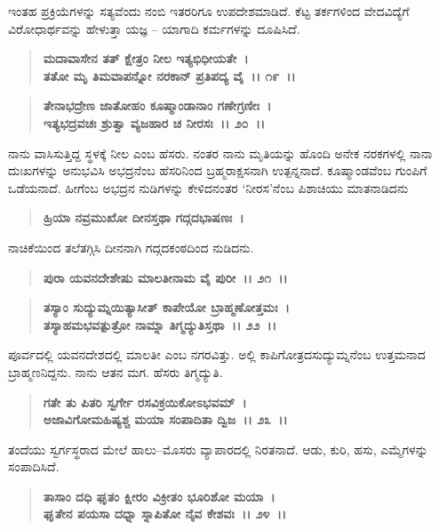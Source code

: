 ಇಂತಹ ಪ್ರಕ್ರಿಯೆಗಳನ್ನು ಸತ್ಯವೆಂದು ನಂಬಿ ಇತರರಿಗೂ ಉಪದೇಶಮಾಡಿದೆ. ಕೆಟ್ಟ ತರ್ಕಗಳಿಂದ ವೇದವಿದ್ಯೆಗೆ ವಿರೋಧಾರ್ಥವನ್ನು ಹೇಳುತ್ತಾ ಯಜ್ಞ – ಯಾಗಾದಿ ಕರ್ಮಗಳನ್ನು ದೂಷಿಸಿದೆ.

\begin{verse}
\textbf{ಮದಾವಾಸೇನ ತತ್ ಕ್ಷೇತ್ರಂ ನೀಲ ಇತ್ಯಭಿಧೀಯತೇ~।}\\\textbf{ತತೋ ಮೃ ತಿಮವಾಪನ್ನೋ ನರಕಾನ್ ಪ್ರತಿಪದ್ಯ ವೈ~।। ೧೯~।। }
\end{verse}

\begin{verse}
\textbf{ತೇನಾಭದ್ರೇಣ ಜಾತೋಹಂ ಕೂಷ್ಮಾಂಡಾನಾಂ ಗಣೇಗ್ರಣೀಃ~।}\\\textbf{ಇತ್ಯಭದ್ರವಚಃ ಶ್ರುತ್ವಾ ವ್ಯಜಹಾರ ಚ ನೀರಸಃ~।। ೨೦~।।}
\end{verse}

ನಾನು ವಾಸಿಸುತ್ತಿದ್ದ ಸ್ಥಳಕ್ಕೆ ನೀಲ ಎಂಬ ಹೆಸರು. ನಂತರ ನಾನು ಮೃತಿಯನ್ನು ಹೊಂದಿ ಅನೇಕ ನರಕಗಳಲ್ಲಿ ನಾನಾ ದುಃಖಗಳನ್ನು ಅನುಭವಿಸಿ ಅಭದ್ರನೆಂಬ ಹೆಸರಿನಿಂದ ಬ್ರಹ್ಮರಾಕ್ಷಸನಾಗಿ ಉತ್ಪನ್ನನಾದೆ. ಕೂಷ್ಮಾಂಡವೆಂಬ ಗುಂಪಿಗೆ ಒಡೆಯನಾದೆ. ಹೀಗೆಂಬ ಅಭದ್ರನ ನುಡಿಗಳನ್ನು ಕೇಳಿದನಂತರ `ನೀರಸ'ನೆಂಬ ಪಿಶಾಚಿಯು ಮಾತನಾಡಿದನು

\begin{verse}
\textbf{ಹ್ರಿಯಾ ನವ್ರಮುಖೋ ದೀನಸ್ತಥಾ ಗದ್ಗದಭಾಷಣಃ~।}
\end{verse}

ನಾಚಿಕೆಯಿಂದ ತಲೆತಗ್ಗಿಸಿ ದೀನನಾಗಿ ಗದ್ಗದಕಂಠದಿಂದ ನುಡಿದನು.

\begin{verse}
\textbf{ಪುರಾ ಯವನದೇಶೇಷು ಮಾಲತೀನಾಮ ವೈ ಪುರೀ~।। ೨೧~।। }
\end{verse}

\begin{verse}
\textbf{ತಸ್ಯಾಂ ಸುದ್ಯುಮ್ನಯಿತ್ಯಾಸೀತ್ ಕಾಪೇಯೋ ಬ್ರಾಹ್ಮಣೋತ್ತಮಃ~।}\\\textbf{ತಸ್ಯಾಹಮಭವತ್ಪುತ್ರೋ ನಾಮ್ನಾ ತಿಗ್ಮದ್ಯುತಿಸ್ತಥಾ~।। ೨೨~।।}
\end{verse}

ಪೂರ್ವದಲ್ಲಿ ಯವನದೇಶದಲ್ಲಿ ಮಾಲತೀ ಎಂಬ ನಗರವಿತ್ತು. ಅಲ್ಲಿ ಕಾಪಿಗೋತ್ರದ\break ಸುದ್ಯುಮ್ನನೆಂಬ ಉತ್ತಮನಾದ ಬ್ರಾಹ್ಮಣನಿದ್ದನು. ನಾನು ಆತನ ಮಗ. ಹೆಸರು ತಿಗ್ಮದ್ಯುತಿ.

\begin{verse}
\textbf{ಗತೇ ತು ಪಿತರಿ ಸ್ವರ್ಗೇ ರಸವಿಕ್ರಯಿಕೋಽಭವಮ್~।}\\\textbf{ಅಜಾವಿಗೋಮಹಿಷ್ಯಶ್ಚ ಮಯಾ ಸಂಪಾದಿತಾ ದ್ವಿಜ~।। ೨೩~।।}
\end{verse}

ತಂದೆಯು ಸ್ವರ್ಗಸ್ಥರಾದ ಮೇಲೆ ಹಾಲು–ಮೊಸರು ವ್ಯಾಪಾರದಲ್ಲಿ ನಿರತನಾದೆ. ಆಡು, ಕುರಿ, ಹಸು, ಎಮ್ಮೆಗಳನ್ನು ಸಂಪಾದಿಸಿದೆ.

\begin{verse}
\textbf{ತಾಸಾಂ ದಧಿ ಘೃತಂ ಕ್ಷೀರಂ ವಿಕ್ರೀತಂ ಭೂರಿಶೋ ಮಯಾ~।}\\\textbf{ಘೃತೇನ ಪಯಸಾ ದಧ್ನಾ ಸ್ನಾಪಿತೋ ನೈವ ಕೇಶವಃ~।। ೨೪~।।}
\end{verse}

